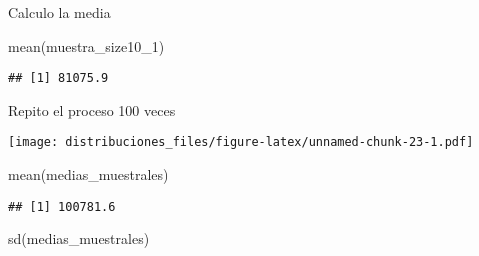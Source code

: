 \documentclass[
]{article}
\newenvironment{Shaded}{\begin{snugshade}}{\end{snugshade}}
\newcommand{\AttributeTok}[1]{\textcolor[rgb]{0.77,0.63,0.00}{#1}}
\newcommand{\DecValTok}[1]{\textcolor[rgb]{0.00,0.00,0.81}{#1}}
\newcommand{\FunctionTok}[1]{\textcolor[rgb]{0.00,0.00,0.00}{#1}}
\newcommand{\NormalTok}[1]{#1}
\newcommand{\OtherTok}[1]{\textcolor[rgb]{0.56,0.35,0.01}{#1}}
\newcommand{\SpecialCharTok}[1]{\textcolor[rgb]{0.00,0.00,0.00}{#1}}
\newcommand{\StringTok}[1]{\textcolor[rgb]{0.31,0.60,0.02}{#1}}
\begin{document}
Calculo la media

\begin{Shaded}
\begin{Highlighting}[]
\FunctionTok{mean}\NormalTok{(muestra\_size10\_1)}
\end{Highlighting}
\end{Shaded}

\begin{verbatim}
## [1] 81075.9
\end{verbatim}

Repito el proceso 100 veces

\begin{Shaded}
\end{Shaded}

\texttt{[image: distribuciones\_files/figure-latex/unnamed-chunk-23-1.pdf]}

\begin{Shaded}
\begin{Highlighting}[]
\FunctionTok{mean}\NormalTok{(medias\_muestrales)}
\end{Highlighting}
\end{Shaded}

\begin{verbatim}
## [1] 100781.6
\end{verbatim}

\begin{Shaded}
\begin{Highlighting}[]
\FunctionTok{sd}\NormalTok{(medias\_muestrales)}
\end{Highlighting}
\end{Shaded}
\end{document}
